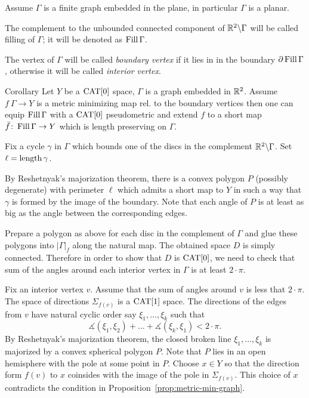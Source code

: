 \documentclass[a4paper,10pt]{amsart}
\begin{document}
Assume $\Gamma$ is a finite graph embedded in the plane,
in particular $\Gamma$ is a planar.

The complement to the unbounded connected component of $\mathbb{R}^2\backslash\Gamma$ will be called filling of $\Gamma$;
it will be denoted as $\mathop{\rm Fill}\Gamma$.

The vertex of $\Gamma$ will be called \emph{boundary vertex}
if it lies in in the boundary $\partial\mathop{\rm Fill}\Gamma$,
otherwise it will be called \emph{interior vertex}.

\begin{thm}{Corollary}\label{cor:planar-minimizing-graph}
Let $Y$ be a $\mathop{\rm CAT}\nolimits[0]$ space,
$\Gamma$ is a graph embedded in $\mathbb{R}^2$.
Assume $f\:\Gamma\to Y$ is a metric minimizing map rel. to the boundary vertices 
then 
one can equip $\mathop{\rm Fill}\Gamma$ with a $\mathop{\rm CAT}\nolimits[0]$ pseudometric 
and extend $f$ to a short map $\bar f\colon\mathop{\rm Fill}\Gamma\to Y$ which is length preserving on $\Gamma$.
\end{thm}

Fix a cycle $\gamma$ in $\Gamma$ which bounds one of the discs in the complement $\mathbb{R}^2\backslash \Gamma$.
Set $\ell=\mathop{\rm length}\nolimits\gamma$.

By Reshetnyak's majorization theorem, there is a convex polygon $P$ (possibly degenerate) with perimeter $\ell$ which admits a short map to $Y$ in such a way that $\gamma$ is formed by the image of the boundary.
Note that each angle of $P$ is at least as big as 
the angle between the corresponding edges.

Prepare a polygon as above for each disc in the complement of $\Gamma$
and glue these polygons into $|\Gamma|_f$ along the natural map.
The obtained space $D$ is simply connected.
Therefore in order to show that $D$ is $\mathop{\rm CAT}\nolimits[0]$,
we need to check that sum of the angles around each interior vertex in $\Gamma$ is at least $2\cdot\pi$.

Fix an interior vertex $v$.
Assume that the sum of angles around $v$ is less that $2\cdot\pi$.
The space of directions $\Sigma_{f(v)}$ is a $\mathop{\rm CAT}\nolimits[1]$ space.
The directions of the edges from $v$ have natural
cyclic order say $\xi_1,\dots,\xi_k$
such that
\[\measuredangle(\xi_1,\xi_2)+\dots+\measuredangle(\xi_k,\xi_1)<2\cdot\pi.\]
By Reshetnyak's majorization theorem,
the closed broken line $\xi_1,\dots,\xi_k$ is majorized by a convex spherical polygon $P$.
Note that $P$ lies in an open hemisphere with the pole  at some point in $P$.
Choose $x\in Y$ so that the direction form $f(v)$ to $x$ coinsides with the image of the pole in $\Sigma_{f(v)}$.
This choice of $x$ contradicts the condition in Proposition~\ref{prop:metric-min-graph}.\qeds
\end{document}
